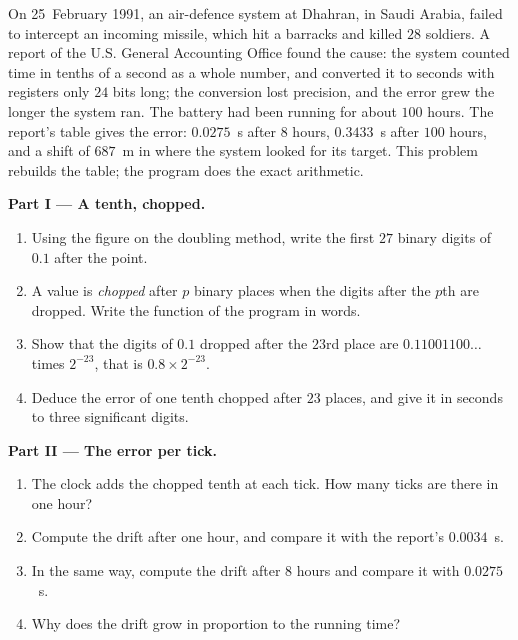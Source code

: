\begin{problem}\label{pb:g10:floating-point:1}
On 25~February 1991, an air-defence system at Dhahran, in Saudi Arabia, failed to intercept an incoming missile,
which hit a barracks and killed $28$ soldiers. A report of the U.S. General Accounting Office found the cause: the
system counted time in tenths of a second as a whole number, and converted it to seconds with registers only $24$
bits long; the conversion lost precision, and the error grew the longer the system ran. The battery had been
running for about $100$ hours. The report's table gives the error: $0.0275$~s after $8$ hours, $0.3433$~s after
$100$ hours, and a shift of $687$~m in where the system looked for its target. This problem rebuilds the table; the
program  does the exact arithmetic.

\medskip\noindent\textbf{Part I --- A tenth, chopped.}
\begin{enumerate}
  \item Using the figure on the doubling method, write the first $27$ binary digits of $0.1$ after the point.
  \item A value is \emph{chopped} after $p$ binary places when the digits after the $p$th are dropped. Write the
    function  of the program in words.
  \item Show that the digits of $0.1$ dropped after the $23$rd place are $0.11001100\dots$ times $2^{-23}$, that
    is $0.8 \times 2^{-23}$.
  \item Deduce the error of one tenth chopped after $23$ places, and give it in seconds to three significant digits.
\end{enumerate}

\medskip\noindent\textbf{Part II --- The error per tick.}
\begin{enumerate}[resume]
  \item The clock adds the chopped tenth at each tick. How many ticks are there in one hour?
  \item Compute the drift after one hour, and compare it with the report's $0.0034$~s.
  \item In the same way, compute the drift after $8$ hours and compare it with $0.0275$~s.
  \item Why does the drift grow in proportion to the running time?
\end{enumerate}


\end{problem}
